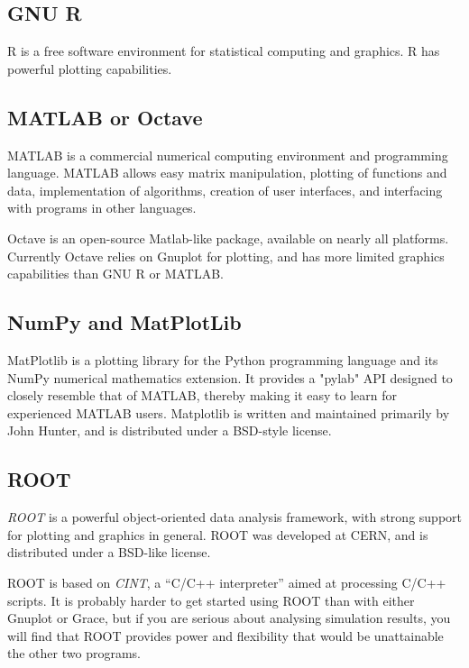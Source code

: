 \subsection{GNU R}

R is a free software environment for statistical computing and graphics.
R has powerful plotting capabilities.


\subsection{MATLAB or Octave}

MATLAB is a commercial numerical computing environment and programming language.
MATLAB allows easy matrix manipulation, plotting of functions and data,
implementation of algorithms, creation of user interfaces, and interfacing
with programs in other languages.

Octave is an open-source Matlab-like package, available on nearly all platforms.
Currently Octave relies on Gnuplot for plotting, and has more limited
graphics capabilities than GNU R or MATLAB.

\subsection{NumPy and MatPlotLib}

MatPlotlib is a plotting library for the Python programming language and
its NumPy numerical mathematics extension. It provides a "pylab" API designed
to closely resemble that of MATLAB, thereby making it easy to learn
for experienced MATLAB users. Matplotlib is written and maintained primarily
by John Hunter, and is distributed under a BSD-style license.


\subsection{ROOT}

\textit{ROOT} is a powerful object-oriented data analysis framework,
with strong support for plotting and graphics in general.
ROOT was developed at CERN, and is distributed under a BSD-like license.

ROOT is based on \textit{CINT}, a ``C/C++ interpreter''
aimed at processing C/C++ scripts. It is probably harder to get started
using ROOT than with either Gnuplot or Grace, but if you are serious
about analysing simulation results, you will find that ROOT provides
power and flexibility that would be unattainable the other two programs.

